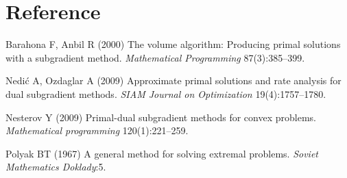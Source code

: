 \documentclass[
  a4paper,
,tablecaptionabove
]{scrartcl}
\numberwithin{equation}{section}
\newlength{\cslhangindent}
\newenvironment{cslreferences}%
  {\setlength{\parindent}{0pt}%
  \everypar{\setlength{\hangindent}{\cslhangindent}}\ignorespaces}%
  {\par}
\begin{document}
\hypertarget{sec:reference}{%
  \section*{Reference}\label{reference}}

\hypertarget{sec:refs}{}
\begin{cslreferences}
  \leavevmode\hypertarget{sec:ref-barahona_volume_2000}{}%
  Barahona F, Anbil R (2000) The volume algorithm: Producing primal
  solutions with a subgradient method. \emph{Mathematical Programming}
  87(3):385--399.

  \leavevmode\hypertarget{sec:ref-nedic_approximate_2009}{}%
  Nedić A, Ozdaglar A (2009) Approximate primal solutions and rate
  analysis for dual subgradient methods. \emph{SIAM Journal on
    Optimization} 19(4):1757--1780.

  \leavevmode\hypertarget{sec:ref-nesterov_primal-dual_2009}{}%
  Nesterov Y (2009) Primal-dual subgradient methods for convex problems.
  \emph{Mathematical programming} 120(1):221--259.

  \leavevmode\hypertarget{sec:ref-polyak_general_nodate}{}%
  Polyak BT (1967) A general method for solving extremal problems.
  \emph{Soviet Mathematics Doklady}:5.
\end{cslreferences}
\end{document}
